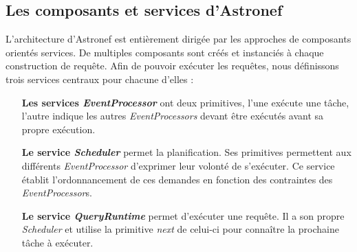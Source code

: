\subsection{Les composants et services d'Astronef}
L'architecture d'Astronef est entièrement dirigée par les approches de composants orientés services. De multiples composants sont créés et instanciés à chaque construction de requête. Afin de pouvoir exécuter les requêtes, nous définissons trois services centraux pour chacune d'elles :
\begin{itemize}
	\item[\textbf{Les services \textit{EventProcessor}}] ont deux primitives, l'une exécute une tâche, l'autre indique les autres \textit{EventProcessors} devant être exécutés avant sa propre exécution.
	\item[\textbf{Le service \textit{Scheduler}}] permet la planification. Ses primitives permettent aux différents \textit{EventProcessor} d'exprimer leur volonté de s'exécuter. Ce service établit l'ordonnancement de ces demandes en fonction des contraintes des \textit{EventProcessor}s.
	\item[\textbf{Le service \textit{QueryRuntime}}] permet d'exécuter une requête. Il a son propre \textit{Scheduler} et utilise la primitive \textit{next} de celui-ci pour connaître la prochaine tâche à exécuter.
\end{itemize}

